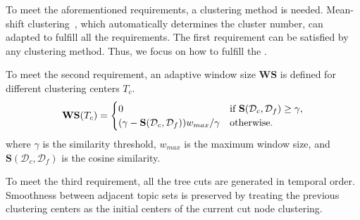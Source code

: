To meet the aforementioned requirements, a clustering method is needed.
Mean-shift clustering~\cite{comaniciu2002mean}, which automatically determines the cluster number, can  adapted to fulfill all the requirements.
The first requirement can be satisfied by any clustering method. Thus, we focus on how to fulfill the .

To meet the second requirement, an adaptive window size $\mathbf{WS}$ is defined for different clustering centers $T_c$.
\begin{equation}
\small
	\mathbf{WS}(T_c)=
		\begin{cases}
			0 & \text{if } \mathbf{S}(\mathcal{D}_c, \mathcal{D}_f)\ge \gamma,\\
			{(\gamma-\mathbf{S}(\mathcal{D}_c, \mathcal{D}_f))w_{max}/\gamma} & \text{otherwise}.
		\end{cases}
\end{equation}
where $\gamma$ is the similarity threshold, $w_{max}$ is the maximum window size, and $\mathbf{S}(\mathcal{D}_c, \mathcal{D}_f)$ is the cosine similarity.

To meet the third requirement, all the tree cuts are generated in temporal order.
Smoothness between adjacent topic sets is preserved by treating the previous clustering centers as the initial centers of the current cut node clustering.


